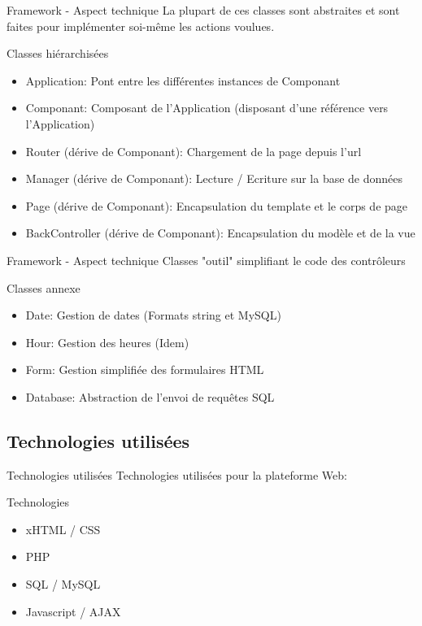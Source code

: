 \begin{frame}{Framework - Aspect technique}
    La plupart de ces classes sont abstraites et sont faites pour implémenter soi-même les actions voulues.
    \begin{block}{Classes hiérarchisées}
    \begin{itemize}
    \item Application: Pont entre les différentes instances de Componant
    \item Componant: Composant de l'Application (disposant d'une référence vers l'Application)
    \item Router (dérive de Componant): Chargement de la page depuis l'url
    \item Manager (dérive de Componant): Lecture / Ecriture sur la base de données
    \item Page (dérive de Componant): Encapsulation du template et le corps de page
    \item BackController (dérive de Componant): Encapsulation du modèle et de la vue
    \end{itemize}
    \end{block}
\end{frame}

\begin{frame}{Framework - Aspect technique}
    Classes "outil" simplifiant le code des contrôleurs
    \begin{block}{Classes annexe}
    \begin{itemize}
    \item Date: Gestion de dates (Formats string et MySQL)
    \item Hour: Gestion des heures (Idem)
    \item Form: Gestion simplifiée des formulaires HTML
    \item Database: Abstraction de l'envoi de requêtes SQL
    \end{itemize}
    \end{block}
\end{frame}

\subsection{Technologies utilisées}
\begin{frame}{Technologies utilisées}
    Technologies utilisées pour la plateforme Web:
    \begin{block}{Technologies}
    \begin{itemize}
    \item xHTML / CSS
    \item PHP
    \item SQL / MySQL
    \item Javascript / AJAX
    \end{itemize}
    \end{block}
\end{frame}
